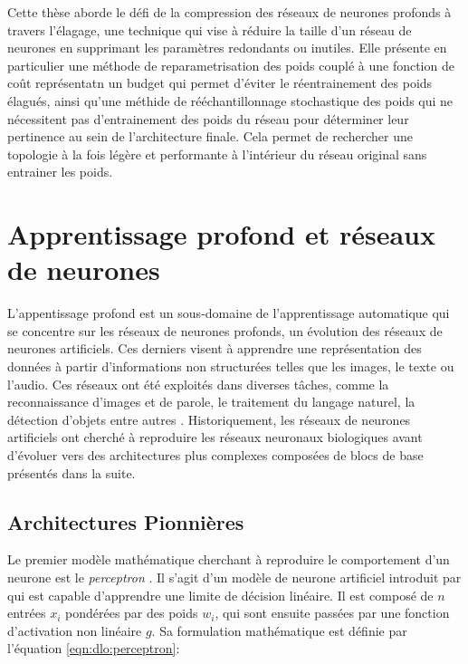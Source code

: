 Cette thèse aborde le défi de la compression des réseaux de neurones profonds à
travers l'élagage, une technique qui vise à réduire la taille d'un réseau de
neurones en supprimant les paramètres redondants ou inutiles. Elle présente en
particulier une méthode de reparametrisation des poids couplé à une fonction de
coût représentatn un budget qui permet d'éviter le réentrainement des poids
élagués, ainsi qu'une méthide de rééchantillonnage stochastique des poids qui ne
nécessitent pas d'entrainement des poids du réseau pour déterminer leur
pertinence au sein de l'architecture finale. Cela permet de rechercher une
topologie à la fois légère et performante à l'intérieur du réseau original sans
entrainer les poids.\\

\section*{Apprentissage profond et réseaux de neurones}

L'appentissage profond est un sous-domaine de l'apprentissage automatique qui se
concentre sur les réseaux de neurones profonds, un évolution des réseaux de
neurones artificiels. Ces derniers visent à apprendre une représentation des
données à partir d'informations non structurées telles que les images, le texte
ou l'audio. Ces réseaux ont été exploités dans diverses tâches, comme la
reconnaissance d'images et de parole, le traitement du langage naturel, la
détection d'objets entre autres
\cite{DBLP:conf/icml/AmodeiABCCCCCCD16,DBLP:conf/nips/RenHGS15,DBLP:conf/nips/KrizhevskySH12,
  DBLP:conf/emnlp/BudzianowskiV19,DBLP:conf/cvpr/HeZRS16,jumper2021highly}.
Historiquement, les réseaux de neurones artificiels ont cherché à reproduire les
réseaux neuronaux biologiques \cite{mcculloch1943logical} avant d'évoluer vers
des architectures plus complexes composées de blocs de base présentés dans la
suite.

\subsection*{Architectures Pionnières}\label{sec:dlo:early_architectures}


Le premier modèle mathématique cherchant à reproduire le comportement d'un
neurone est le \emph{perceptron} \cite{rosenblatt1958perceptron}. Il s'agit d'un
modèle de neurone artificiel introduit par \citeauthor{rosenblatt1958perceptron}
qui est capable d'apprendre une limite de décision linéaire. Il est composé de
$n$ entrées $x_i$ pondérées par des poids $w_i$, qui sont ensuite passées par
une fonction d'activation non linéaire $g$. Sa formulation mathématique est
définie par l'équation \cref{eqn:dlo:perceptron}:

